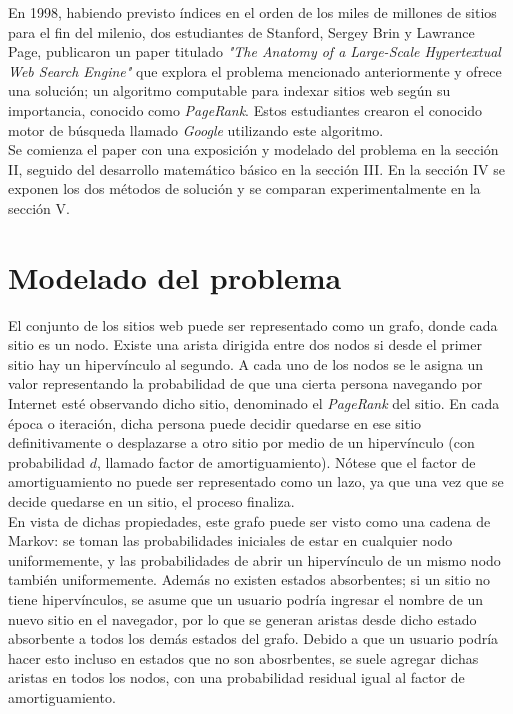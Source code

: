 \documentclass[%
    final,
    notitlepage,
    narroweqnarray,
    inline,
    twoside,
    invited
    ]{lib/ieee}
\begin{document}
En 1998, habiendo previsto índices en el orden
de los miles de millones de sitios para el fin del milenio, dos estudiantes de Stanford, Sergey Brin y Lawrance Page, publicaron un paper titulado
\textit{"The Anatomy of a Large-Scale Hypertextual Web Search Engine"} que explora el problema mencionado anteriormente y ofrece una solución; un
algoritmo computable para indexar sitios web según su importancia, conocido como \textit{PageRank}. Estos estudiantes crearon el conocido motor de
búsqueda llamado \textit{Google} utilizando este algoritmo. \\

Se comienza el paper con una exposición y modelado del problema en la sección II, seguido del desarrollo matemático básico en la sección III.
En la sección IV se exponen los dos métodos de solución y se comparan experimentalmente en la sección V.


\section{Modelado del problema}

\par El conjunto de los sitios web puede ser representado como un grafo, donde cada sitio es un nodo. Existe una arista dirigida entre dos nodos si
desde el primer sitio hay un hipervínculo al segundo. A cada uno de los nodos se le asigna un valor representando la probabilidad de que
una cierta persona navegando por Internet esté observando dicho sitio, denominado el \textit{PageRank} del sitio.
En cada época o iteración, dicha persona puede decidir quedarse en ese sitio definitivamente o desplazarse a otro sitio por medio de un hipervínculo
(con probabilidad $d$, llamado factor de amortiguamiento).
Nótese que el factor de amortiguamiento no puede ser representado como un lazo, ya que una vez que se decide quedarse en un sitio, el proceso finaliza.\\

En vista de dichas propiedades, este grafo puede ser visto como una cadena de Markov: se toman las probabilidades iniciales de
estar en cualquier nodo uniformemente, y las probabilidades de abrir un hipervínculo de un mismo nodo también uniformemente. Además no existen
estados absorbentes; si un sitio no tiene hipervínculos, se asume que un usuario podría ingresar el nombre de un nuevo sitio en el navegador, por lo que
se generan aristas desde dicho estado absorbente a todos los demás estados del grafo. Debido a que un usuario podría hacer esto incluso en estados
que no son abosrbentes, se suele agregar dichas aristas en todos los nodos, con una probabilidad residual igual al factor de amortiguamiento.\\
\end{document}
